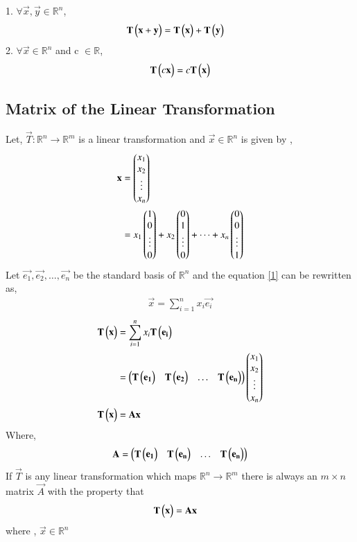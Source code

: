 \documentclass[journal,12pt,twocolumn]{IEEEtran}
\begin{document}
 1. $\forall \vec{x},\vec{y} \in \mathbb{R}^n$,
 \begin{align}
     \mathbf{T}\begin{pmatrix}\mathbf{x}+\mathbf{y}\end{pmatrix}&=\mathbf{T}\begin{pmatrix}\mathbf{x}\end{pmatrix}+\mathbf{T}\begin{pmatrix}\mathbf{y}\end{pmatrix} 
 \end{align}
 2. $\forall \vec{x}\in \mathbb{R}^n$ and c $\in \mathbb{R}$,
 \begin{align}
     \mathbf{T}\begin{pmatrix}c\mathbf{x}\end{pmatrix}=c\mathbf{T}\begin{pmatrix}\mathbf{x}\end{pmatrix}
 \end{align}
\subsection{Matrix of the Linear Transformation}
Let,
$\vec{T} :\mathbb{R}^n \rightarrow  \mathbb{R}^m$ is a linear transformation and $\vec{x} \in \mathbb{R}^n$ is given by ,
\begin{align}
    \mathbf{x}&=\begin{pmatrix}x_1\\x_2\\\vdots\\x_n\end{pmatrix}\\
    &=x_1\begin{pmatrix}1\\0\\\vdots\\0\end{pmatrix}+x_2\begin{pmatrix}0\\1\\\vdots\\0\end{pmatrix}+\dots+x_n\begin{pmatrix}0\\0\\\vdots\\1\end{pmatrix}\label{1}
\end{align}
Let $\vec{e_1},\vec{e_2},\dots,\vec{e_n}$ be the standard basis of $\mathbb{R}^n$ and the equation \eqref{1} can be rewritten as,
\begin{align}
    \vec{x}=\sum_{i=1}^{n} x_i\vec{e_i}
\end{align}
\begin{align}
    \mathbf{T}\begin{pmatrix}\mathbf{x}\end{pmatrix}&=\sum_{i=1}^{n} x_i\mathbf{T}\begin{pmatrix}\mathbf{e_i}\end{pmatrix}\\
    &=\begin{pmatrix}\mathbf{T}\begin{pmatrix}\mathbf{e_1}\end{pmatrix} &\mathbf{T}\begin{pmatrix}\mathbf{e_2}\end{pmatrix}& \dots &\mathbf{T}\begin{pmatrix}\mathbf{e_n}\end{pmatrix}\end{pmatrix}\begin{pmatrix}x_1\\x_2\\\vdots\\x_n\end{pmatrix}\\
   \mathbf{T}\begin{pmatrix}\mathbf{x}\end{pmatrix} &=\mathbf{A}\mathbf{x}\label{ax}
\end{align}
Where,
\begin{align}
    \mathbf{A}=\begin{pmatrix}\mathbf{T}\begin{pmatrix}\mathbf{e_1}\end{pmatrix} &\mathbf{T}\begin{pmatrix}\mathbf{e_n}\end{pmatrix}& \dots &\mathbf{T}\begin{pmatrix}\mathbf{e_n}\end{pmatrix}\end{pmatrix}
\end{align}
If  $\vec{T}$  is any linear transformation which maps $\mathbb{R}^n \rightarrow  \mathbb{R}^m$ there is always an $m\times n$  matrix  $\vec{A}$  with the property that
\begin{align}
    \mathbf{T}\begin{pmatrix}\mathbf{x}\end{pmatrix} &=\mathbf{A}\mathbf{x}\notag
\end{align}
where , $\vec{x} \in \mathbb{R}^n$
\end{document}
